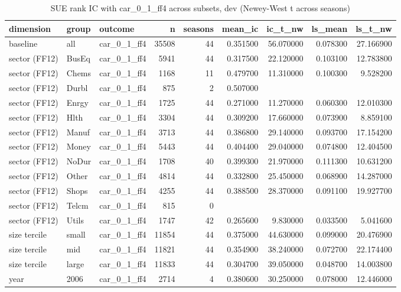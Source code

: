 \begin{table}
\caption{SUE rank IC with car_0_1_ff4 across subsets, dev (Newey-West t across seasons)}
\label{tab:cd_surprise_robustness__dev}
\begin{tabular}{lllrrrrrr}
\toprule
dimension & group & outcome & n & seasons & mean\_ic & ic\_t\_nw & ls\_mean & ls\_t\_nw \\
\midrule
baseline & all & car\_0\_1\_ff4 & 35508 & 44 & 0.351500 & 56.070000 & 0.078300 & 27.166900 \\
sector (FF12) & BusEq & car\_0\_1\_ff4 & 5941 & 44 & 0.317500 & 22.120000 & 0.103100 & 12.783800 \\
sector (FF12) & Chems & car\_0\_1\_ff4 & 1168 & 11 & 0.479700 & 11.310000 & 0.100300 & 9.528200 \\
sector (FF12) & Durbl & car\_0\_1\_ff4 & 875 & 2 & 0.507000 &  &  &  \\
sector (FF12) & Enrgy & car\_0\_1\_ff4 & 1725 & 44 & 0.271000 & 11.270000 & 0.060300 & 12.010300 \\
sector (FF12) & Hlth & car\_0\_1\_ff4 & 3304 & 44 & 0.309200 & 17.660000 & 0.073900 & 8.859100 \\
sector (FF12) & Manuf & car\_0\_1\_ff4 & 3713 & 44 & 0.386800 & 29.140000 & 0.093700 & 17.154200 \\
sector (FF12) & Money & car\_0\_1\_ff4 & 5443 & 44 & 0.404400 & 29.040000 & 0.074800 & 12.404500 \\
sector (FF12) & NoDur & car\_0\_1\_ff4 & 1708 & 40 & 0.399300 & 21.970000 & 0.111300 & 10.631200 \\
sector (FF12) & Other & car\_0\_1\_ff4 & 4814 & 44 & 0.332800 & 25.450000 & 0.068900 & 14.287000 \\
sector (FF12) & Shops & car\_0\_1\_ff4 & 4255 & 44 & 0.388500 & 28.370000 & 0.091100 & 19.927700 \\
sector (FF12) & Telcm & car\_0\_1\_ff4 & 815 & 0 &  &  &  &  \\
sector (FF12) & Utils & car\_0\_1\_ff4 & 1747 & 42 & 0.265600 & 9.830000 & 0.033500 & 5.041600 \\
size tercile & small & car\_0\_1\_ff4 & 11854 & 44 & 0.375000 & 44.630000 & 0.099000 & 20.476900 \\
size tercile & mid & car\_0\_1\_ff4 & 11821 & 44 & 0.354900 & 38.240000 & 0.072700 & 22.174400 \\
size tercile & large & car\_0\_1\_ff4 & 11833 & 44 & 0.304700 & 39.050000 & 0.048700 & 14.003800 \\
year & 2006 & car\_0\_1\_ff4 & 2714 & 4 & 0.380600 & 30.250000 & 0.078000 & 12.446000 \\

\end{tabular}
\end{table}
